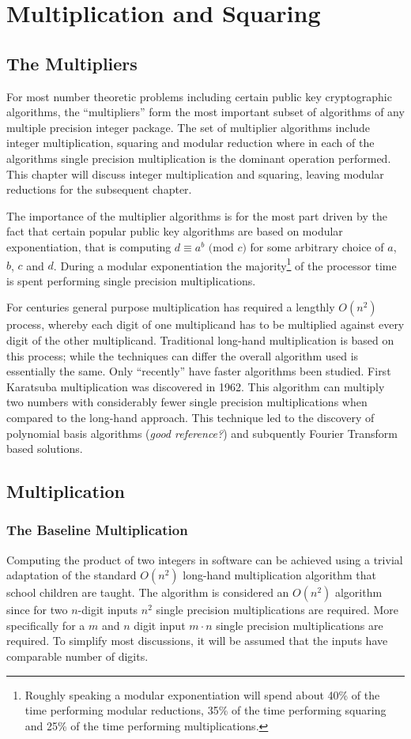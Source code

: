 \documentclass[b5paper]{book}
\begin{document}
\chapter{Multiplication and Squaring}
\section{The Multipliers}
For most number theoretic problems including certain public key cryptographic algorithms, the ``multipliers'' form the most important subset of 
algorithms of any multiple precision integer package.  The set of multiplier algorithms include integer multiplication, squaring and modular reduction 
where in each of the algorithms single precision multiplication is the dominant operation performed.  This chapter will discuss integer multiplication 
and squaring, leaving modular reductions for the subsequent chapter.  

The importance of the multiplier algorithms is for the most part driven by the fact that certain popular public key algorithms are based on modular 
exponentiation, that is computing $d \equiv a^b \mbox{ (mod }c\mbox{)}$ for some arbitrary choice of $a$, $b$, $c$ and $d$.  During a modular
exponentiation the majority\footnote{Roughly speaking a modular exponentiation will spend about 40\% of the time performing modular reductions, 
35\% of the time performing squaring and 25\% of the time performing multiplications.} of the processor time is spent performing single precision 
multiplications.

For centuries general purpose multiplication has required a lengthly $O(n^2)$ process, whereby each digit of one multiplicand has to be multiplied 
against every digit of the other multiplicand.  Traditional long-hand multiplication is based on this process;  while the techniques can differ the 
overall algorithm used is essentially the same.  Only ``recently'' have faster algorithms been studied.  First Karatsuba multiplication was discovered in 
1962.  This algorithm can multiply two numbers with considerably fewer single precision multiplications when compared to the long-hand approach.  
This technique led to the discovery of polynomial basis algorithms (\textit{good reference?}) and subquently Fourier Transform based solutions.  

\section{Multiplication}
\subsection{The Baseline Multiplication}
\label{sec:basemult}
Computing the product of two integers in software can be achieved using a trivial adaptation of the standard $O(n^2)$ long-hand multiplication
algorithm that school children are taught.  The algorithm is considered an $O(n^2)$ algorithm since for two $n$-digit inputs $n^2$ single precision 
multiplications are required.  More specifically for a $m$ and $n$ digit input $m \cdot n$ single precision multiplications are required.  To 
simplify most discussions, it will be assumed that the inputs have comparable number of digits.  
\end{document}

